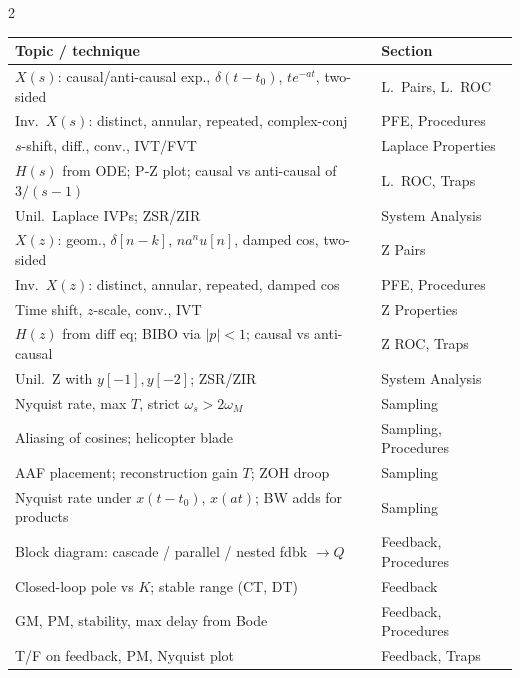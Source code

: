 \documentclass[12pt]{extarticle}
\begin{document}
\begin{multicols*}{2}
\begin{tabularx}{\columnwidth}{@{}X p{1.4in}@{}}
\toprule
\textbf{Topic / technique} & \textbf{Section} \\
\midrule
$X(s)$: causal/anti-causal exp., $\delta(t{-}t_0)$, $te^{-at}$, two-sided & L.\ Pairs, L.\ ROC \\
Inv.\ $X(s)$: distinct, annular, repeated, complex-conj & PFE, Procedures \\
$s$-shift, diff., conv., IVT/FVT & Laplace Properties \\
$H(s)$ from ODE; P-Z plot; causal vs anti-causal of $3/(s{-}1)$ & L.\ ROC, Traps \\
Unil.\ Laplace IVPs; ZSR/ZIR & System Analysis \\
$X(z)$: geom., $\delta[n{-}k]$, $na^n u[n]$, damped cos, two-sided & Z Pairs \\
Inv.\ $X(z)$: distinct, annular, repeated, damped cos & PFE, Procedures \\
Time shift, $z$-scale, conv., IVT & Z Properties \\
$H(z)$ from diff eq; BIBO via $|p|{<}1$; causal vs anti-causal & Z ROC, Traps \\
Unil.\ Z with $y[-1], y[-2]$; ZSR/ZIR & System Analysis \\
Nyquist rate, max $T$, strict $\omega_s{>}2\omega_M$ & Sampling \\
Aliasing of cosines; helicopter blade & Sampling, Procedures \\
AAF placement; reconstruction gain $T$; ZOH droop & Sampling \\
Nyquist rate under $x(t{-}t_0)$, $x(at)$; BW adds for products & Sampling \\
Block diagram: cascade / parallel / nested fdbk $\to Q$ & Feedback, Procedures \\
Closed-loop pole vs $K$; stable range (CT, DT) & Feedback \\
GM, PM, stability, max delay from Bode & Feedback, Procedures \\
T/F on feedback, PM, Nyquist plot & Feedback, Traps \\
\bottomrule
\end{tabularx}

\end{multicols*}
\end{document}
